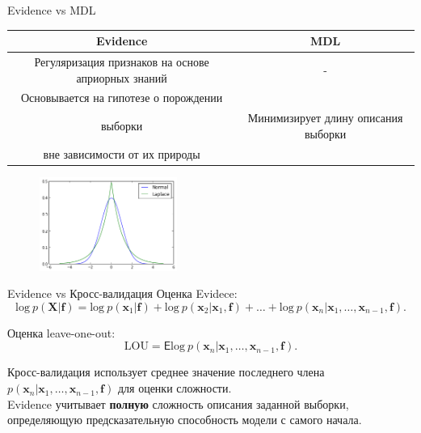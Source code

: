 \documentclass[10pt,pdf,utf8,russian,aspectratio=169]{beamer}
\begin{document}
\begin{frame}{Evidence vs MDL}
\begin{tabular}{ c | c  }
  \hline			
  Evidence & MDL \\
  \hline  
Регуляризация признаков на основе априорных знаний &  - \\
  \hline  
Основывается на гипотезе о порождении\\ выборки & Минимизирует длину описания выборки\\ вне зависимости от их природы \\
  \hline  

\end{tabular}


\begin{figure}
  \centering
 \includegraphics[width=0.4\textwidth]{laplace.png}
\label{fig:1}\qquad

\end{figure}
\end{frame}

\begin{frame}{Evidence vs Кросс-валидация}
Оценка Evidece:
\[
\text{log}~p(\mathbf{X}|\mathbf{f}) = \text{log}~p(\mathbf{x}_1|\mathbf{f}) + \text{log}~p(\mathbf{x}_2|\mathbf{x}_1, \mathbf{f}) + \dots +  \text{log}~p(\mathbf{x}_n|\mathbf{x}_1,\dots,\mathbf{x}_{n-1}, \mathbf{f}).
\]

Оценка leave-one-out:
\[
\text{LOU} = \mathsf{E} \text{log}~p(\mathbf{x}_n|\mathbf{x}_1,\dots,\mathbf{x}_{n-1}, \mathbf{f}).
\]

Кросс-валидация использует среднее значение последнего члена $p(\mathbf{x}_n|\mathbf{x}_1,\dots,\mathbf{x}_{n-1}, \mathbf{f})$ для оценки сложности. \\
Evidence учитывает \textbf{полную} сложность описания заданной выборки, определяющую предсказательную способность модели с самого начала.
\end{frame}
\end{document}
